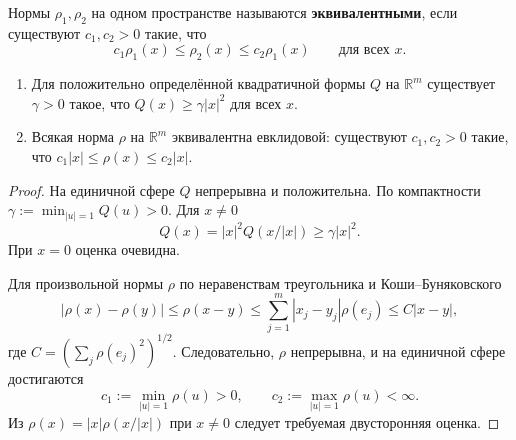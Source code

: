 \label{ticket:11}

\begin{definition}
Нормы $\rho_1,\rho_2$ на одном пространстве называются \textbf{эквивалентными}, если существуют $c_1,c_2>0$ такие, что
\[
  c_1\rho_1(x)\le\rho_2(x)\le c_2\rho_1(x)
  \qquad\text{для всех }x.
\]
\end{definition}

\begin{lemma}
\begin{enumerate}
  \item Для положительно определённой квадратичной формы $Q$ на $\mathbb R^m$ существует $\gamma>0$ такое, что $Q(x)\ge\gamma|x|^2$ для всех $x$.
  \item Всякая норма $\rho$ на $\mathbb R^m$ эквивалентна евклидовой: существуют $c_1,c_2>0$ такие, что $c_1|x|\le\rho(x)\le c_2|x|$.
\end{enumerate}
\end{lemma}

\begin{proof}
На единичной сфере $Q$ непрерывна и положительна.
По компактности $\gamma:=\min_{|u|=1}Q(u)>0$.
Для $x\ne0$
\[
  Q(x)=|x|^2Q(x/|x|)\ge\gamma|x|^2.
\]
При $x=0$ оценка очевидна.

Для произвольной нормы $\rho$ по неравенствам треугольника и Коши--Буняковского
\[
  |\rho(x)-\rho(y)|\le\rho(x-y)
  \le\sum_{j=1}^m|x_j-y_j|\rho(e_j)
  \le C|x-y|,
\]
где $C=(\sum_j\rho(e_j)^2)^{1/2}$.
Следовательно, $\rho$ непрерывна, и на единичной сфере достигаются
\[
  c_1:=\min_{|u|=1}\rho(u)>0,
  \qquad c_2:=\max_{|u|=1}\rho(u)<\infty.
\]
Из $\rho(x)=|x|\rho(x/|x|)$ при $x\ne0$ следует требуемая двусторонняя оценка.
\end{proof}
